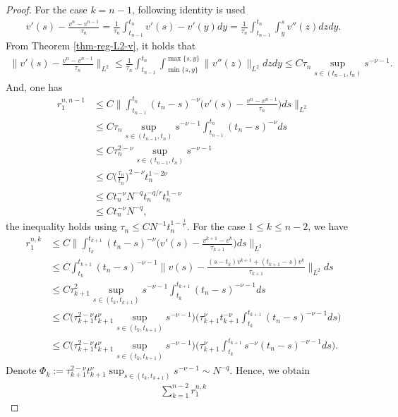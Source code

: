 \documentclass[10pt,a4paper]{amsart}
\begin{document}
\begin{proof}
For the case $k= n-1$, following identity is used
\begin{align*}
v'(s)-\frac{v^{n}-v^{n-1}}{\tau_{n}}=\frac{1}{\tau_{n}}\int_{t_{n-1}}^{t_{n}}v'(s)-v'(y)dy=\frac{1}{\tau_{n}}\int_{t_{n-1}}^{t_{n}}\int_{y}^sv''(z)dzdy.
\end{align*}
From Theorem \ref{thm-reg-L2-v}, it holds that
\begin{align*}
\bigg\|v'(s)-\frac{v^{n}-v^{n-1}}{\tau_{n}}\bigg\|_{L^2}
\le \frac{1}{\tau_{n}}\int_{t_{n-1}}^{t_{n}}\int_{\min\{s,y\}}^{\max\{s,y\}}\|v''(z)\|_{L^2}dzdy\le C\tau_{n}\sup_{s\in(t_{n-1},t_n)} s^{-\nu-1}.
\end{align*}
And, one has
\begin{align*}
r_1^{n,n-1}
&\le C\bigg\|\int_{t_{n-1}}^{t_{n}}(t_n-s)^{-\nu}\bigg(v'(s)-\frac{v^{n}-v^{n-1}}{\tau_{n}}\bigg)ds\bigg\|_{L^2}\\
&\le C\tau_{n}\sup_{s\in(t_{n-1},t_n)} s^{-\nu-1}\int_{t_{n-1}}^{t_{n}}(t_n-s)^{-\nu}ds\\
&\le C\tau_n^{2-\nu}\sup_{s\in(t_{n-1},t_n)} s^{-\nu-1}\\
&\le C\bigg(\frac{\tau_n}{t_n}\bigg)^{2-\nu}t_n^{1-2\nu}\\
&\le Ct_n^{-\nu}N^{-q}t_n^{-q/r}t_n^{1-\nu}\\
&\le Ct_n^{-\nu}N^{-q},
\end{align*}
the inequality holds using $\tau_n\leq CN^{-1}t_n^{1-\frac{1}{r}}$.
For the case $1\le k\le n-2$, we have
\begin{align*}
r_1^{n,k}
&\le C\bigg\|\int_{t_{k}}^{t_{k+1}}(t_n-s)^{-\nu}\bigg(v'(s)-\frac{v^{k+1}-v^{k}}{\tau_{k+1}}\bigg)ds\bigg\|_{L^2}\\
&\le C\int_{t_{k}}^{t_{k+1}}(t_n-s)^{-\nu-1}\bigg\|v(s)-\frac{(s-t_k)v^{k+1}+(t_{k+1}-s)v^{k}}{\tau_{k+1}}\bigg\|_{L^2}ds\\
&\le C\tau_{k+1}^2\sup_{s\in(t_k,t_{k+1})}s^{-\nu-1}\int_{t_{k}}^{t_{k+1}}(t_n-s)^{-\nu-1}ds\\
&\le C\bigg(\tau_{k+1}^{2-\nu}t_{k+1}^\nu\sup_{s\in(t_k,t_{k+1})}s^{-\nu-1}\bigg)\bigg(\tau_{k+1}^\nu t_{k+1}^{-\nu}\int_{t_k}^{t_{k+1}}(t_n-s)^{-\nu-1}ds\bigg)\\
&\le C\bigg(\tau_{k+1}^{2-\nu}t_{k+1}^\nu\sup_{s\in(t_k,t_{k+1})}s^{-\nu-1}\bigg)\bigg(\tau_{k+1}^\nu \int_{t_k}^{t_{k+1}}s^{-\nu}(t_n-s)^{-\nu-1}ds\bigg).
\end{align*}
Denote $\Phi_k:=\tau_{k+1}^{2-\nu}t_{k+1}^\nu\sup_{s\in(t_k,t_{k+1})}s^{-\nu-1}\sim N^{-q}$. Hence, we obtain
\begin{align*}
\sum_{k=1}^{n-2}r_1^{n,k}

\end{align*}
\end{proof}
\end{document}
